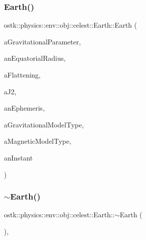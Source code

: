 \subsubsection{\texorpdfstring{Earth()}{Earth()}}
{\footnotesize\ttfamily ostk\+::physics\+::env\+::obj\+::celest\+::\+Earth\+::\+Earth (\begin{DoxyParamCaption}\item[{const \hyperlink{classostk_1_1physics_1_1units_1_1_derived}{Derived} \&}]{a\+Gravitational\+Parameter,  }\item[{const \hyperlink{classostk_1_1physics_1_1units_1_1_length}{Length} \&}]{an\+Equatorial\+Radius,  }\item[{const Real \&}]{a\+Flattening,  }\item[{const Real \&}]{a\+J2,  }\item[{const Shared$<$ \hyperlink{classostk_1_1physics_1_1env_1_1_ephemeris}{Ephemeris} $>$ \&}]{an\+Ephemeris,  }\item[{const \hyperlink{classostk_1_1physics_1_1environment_1_1gravitational_1_1_earth_a9895df78b5c5aab5e981bf765f8c0f05}{Earth\+Gravitational\+Model\+::\+Type} \&}]{a\+Gravitational\+Model\+Type,  }\item[{const \hyperlink{classostk_1_1physics_1_1environment_1_1magnetic_1_1_earth_a30a064d87b6fce338e76aebd3043b6b6}{Earth\+Magnetic\+Model\+::\+Type} \&}]{a\+Magnetic\+Model\+Type,  }\item[{const \hyperlink{classostk_1_1physics_1_1time_1_1_instant}{Instant} \&}]{an\+Instant }\end{DoxyParamCaption})}

\mbox{\label{classostk_1_1physics_1_1env_1_1obj_1_1celest_1_1_earth_ac718f964c68fa41331978751a9ca4818}} 
\subsubsection{\texorpdfstring{$\sim$\+Earth()}{~Earth()}}
{\footnotesize\ttfamily ostk\+::physics\+::env\+::obj\+::celest\+::\+Earth\+::$\sim$\+Earth (\begin{DoxyParamCaption}{ }\end{DoxyParamCaption})\hspace{0.3cm}{\ttfamily [override]}, {\ttfamily [virtual]}}



